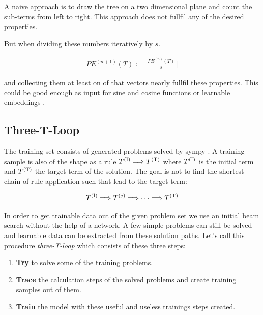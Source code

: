 \documentclass{scrartcl}
\theoremstyle{definition}
\begin{document}
A naive approach is to draw the tree on a two dimensional plane and count the sub-terms from left to right.
This approach does not fullfil any of the desired properties.

But when dividing these numbers iteratively by $s$.

\begin{align}
	PE^{(n+1)}\left( T \right) \coloneqq \lfloor \frac{PE^{(n)} \left( T \right)}{s} \rfloor
\end{align}

and collecting them at least on of that vectors nearly fullfil these properties. 
This could be good enough as input for sine and cosine functions or learnable embeddings \cite{gehring2017convolutional}.


\subsection{Three-T-Loop}

The training set consists of generated problems solved by sympy \cite{10.7717/peerj-cs.103}.
A training sample is also of the shape as a rule $T^{(\text I)} \Longrightarrow T^{(\text T)}$ where $T^{(\text I)}$ is the initial term and $T^{(\text T)}$ the target term of the solution.
The goal is not to find the shortest chain of rule application such that lead to the target term:

\begin{align}
	T^{(\text I)} \Longrightarrow T^{(j)} \Longrightarrow \cdots \Longrightarrow T^{(\text T)}
	\label{eq:calculation_chain}
\end{align}

In order to get trainable data out of the given problem set we use an initial beam search without the help of a network.
A few simple problems can still be solved and learnable data can be extracted from these solution paths.
Let's call this procedure \textit{three-T-loop} which consists of these three steps:

\begin{enumerate}[label=(\roman*)]
	\item \textbf{Try} to solve some of the training problems.
	\item \textbf{Trace} the calculation steps of the solved problems and create training samples out of them.
	\item \textbf{Train} the model with these useful and useless trainings steps created.
\end{enumerate}
\end{document}
